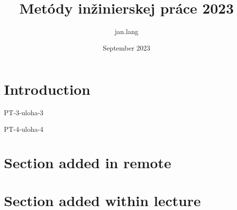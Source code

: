 \documentclass{article}
\title{Metódy inžinierskej práce 2023}
\author{jan.lang }
\date{September 2023}
\begin{document}
\maketitle

\section{Introduction}

PT-3-uloha-3

PT-4-uloha-4

\section{Section added in remote}

\section{Section added within lecture}

\Blinddocument
\end{document}
